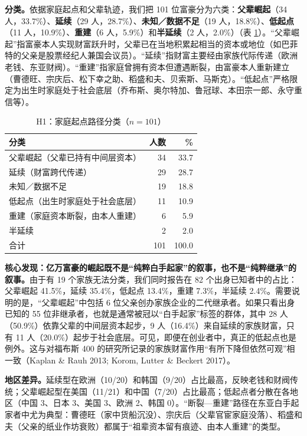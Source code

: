 \documentclass[UTF8,a4paper,11pt]{ctexart}
\begin{document}
\textbf{分类。}依据家庭起点和父辈轨迹，我们把 101 位富豪分为六类：\textbf{父辈崛起}（34 人，33.7\%）、\textbf{延续}（29 人，28.7\%）、\textbf{未知／数据不足}（19 人，18.8\%）、\textbf{低起点}（11 人，10.9\%）、\textbf{重建}（6 人，5.9\%）和\textbf{半延续}（2 人，2.0\%）（表 \ref{tab:h1}）。“父辈崛起”指富豪本人实现财富跃升时，父辈已在当地积累起相当的资本或地位（如巴菲特的父亲是股票经纪人兼国会议员）。“延续”指财富主要经由家族代际传递（欧洲老钱、东亚财阀）。“重建”指家庭曾拥有资本但遭遇断裂，由富豪本人重新建立（曹德旺、宗庆后、松下幸之助、稻盛和夫、贝索斯、马斯克）。“低起点”严格限定为出生时家庭处于社会底层（乔布斯、奥尔特加、鲁冠球、本田宗一郎、永守重信等）。

\begin{table}[htbp]
\centering
\caption{H1：家庭起点路径分类（$n=101$）}
\label{tab:h1}
\small
\begin{tabular}{lrr}
\toprule
分类 & 人数 & \% \\
\midrule
父辈崛起（父辈已持有中间层资本） & 34 & 33.7 \\
延续（财富跨代传递） & 29 & 28.7 \\
未知／数据不足 & 19 & 18.8 \\
低起点（出生时家庭处于社会底层） & 11 & 10.9 \\
重建（家庭资本断裂，由本人重建） & 6 & 5.9 \\
半延续 & 2 & 2.0 \\
\midrule
合计 & 101 & 100.0 \\
\bottomrule
\end{tabular}
\end{table}

\textbf{核心发现：亿万富豪的崛起既不是“纯粹白手起家”的叙事，也不是“纯粹继承”的叙事。}由于有 19 个家族无法分类，我们同时报告在 82 个出身已知者中的占比：父辈崛起 41.5\%，延续 35.4\%，低起点 13.4\%，重建 7.3\%，半延续 2.4\%。需要说明的是，“父辈崛起”中包括 6 位父亲创办家族企业的二代继承者。如果只看出身已知的 55 位非继承者，也就是通常被冠以“白手起家”标签的群体，其中 28 人（50.9\%）依靠父辈的中间层资本起步，9 人（16.4\%）来自延续的家族财富，只有 11 人（20.0\%）起步于社会底层。可见，即便在创业者中，真正的低起点也是例外。这与对福布斯 400 的研究所记录的家族财富作用“有所下降但依然可观”相一致（Kaplan \& Rauh 2013; Korom, Lutter \& Beckert 2017）。

\textbf{地区差异。}延续型在欧洲（10/20）和韩国（9/20）占比最高，反映老钱和财阀传统；父辈崛起型在美国（11/21）和中国（7/20）占比最高；低起点者分散在各地区（中国 3、日本 3、美国 3、欧洲 2、韩国 0）。“断裂—重建”路径在东亚白手起家者中尤为典型：曹德旺（家中货船沉没）、宗庆后（父辈官宦家庭没落）、稻盛和夫（父亲的纸业作坊衰败）都属于“祖辈资本留有痕迹、由本人重建”的类型。
\end{document}
